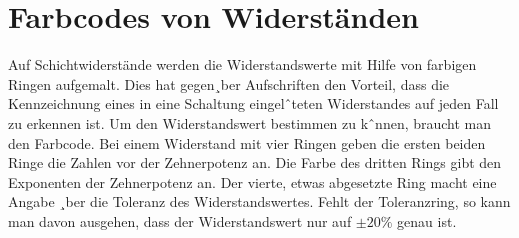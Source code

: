 \begin{multicols}{2}
\end{multicols}


\section{Farbcodes von Widerständen} 

Auf Schichtwiderstände  werden die Widerstandswerte  mit Hilfe von farbigen Ringen aufgemalt. Dies hat gegen¸ber Aufschriften den Vorteil, dass die Kennzeichnung eines in eine Schaltung eingelˆteten Widerstandes auf jeden Fall zu erkennen ist. Um den Widerstandswert bestimmen zu kˆnnen, braucht man den Farbcode. Bei einem Widerstand mit vier Ringen geben die ersten beiden Ringe die Zahlen vor der Zehnerpotenz an. Die Farbe des dritten Rings gibt den Exponenten der Zehnerpotenz an. Der vierte, etwas abgesetzte Ring macht eine Angabe ¸ber die Toleranz des Widerstandswertes. Fehlt der Toleranzring, so kann man davon ausgehen, dass der Widerstandswert nur auf $\pm20\%$ genau ist.
